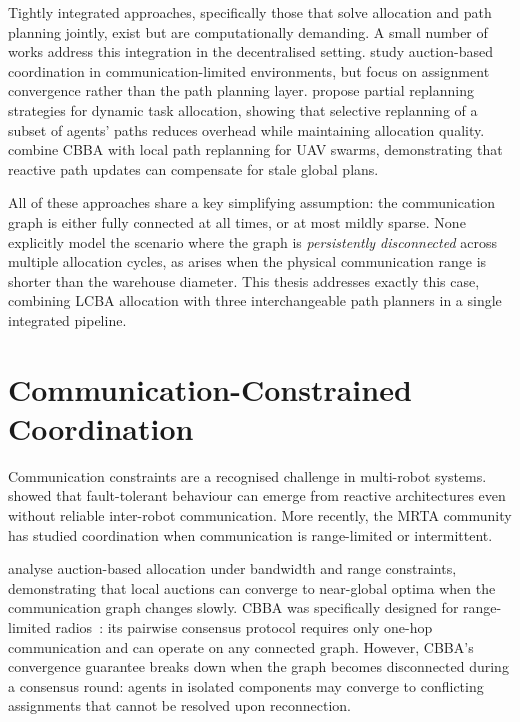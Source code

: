 Tightly integrated approaches, specifically those that solve allocation and path planning
jointly, exist but are computationally demanding.
A small number of works address this integration in the decentralised setting.
\citet{otte2020auctions} study auction-based coordination in communication-limited
environments, but focus on assignment convergence rather than the path planning
layer.
\citet{buckman2019partial} propose partial replanning strategies for dynamic
task allocation, showing that selective replanning of a subset of agents'
paths reduces overhead while maintaining allocation quality.
\citet{chen2021cbbalr} combine CBBA with local path replanning for UAV swarms,
demonstrating that reactive path updates can compensate for stale global plans.

All of these approaches share a key simplifying assumption: the communication
graph is either fully connected at all times, or at most mildly sparse.
None explicitly model the scenario where the graph is \emph{persistently
disconnected} across multiple allocation cycles, as arises when the physical
communication range is shorter than the warehouse diameter.
This thesis addresses exactly this case, combining LCBA allocation
with three interchangeable path planners in a single integrated pipeline.


\section{Communication-Constrained Coordination}
\label{sec:bg_communication}

Communication constraints are a recognised challenge in multi-robot systems.
\citet{parker1998alliance} showed that fault-tolerant behaviour can emerge from
reactive architectures even without reliable inter-robot communication.
More recently, the MRTA community has studied coordination when communication
is range-limited or intermittent.

\citet{otte2020auctions} analyse auction-based allocation under bandwidth and
range constraints, demonstrating that local auctions can converge to near-global
optima when the communication graph changes slowly.
CBBA was specifically designed for range-limited radios~\cite{choi2009consensus}:
its pairwise consensus protocol requires only one-hop communication and can
operate on any connected graph.
However, CBBA's convergence guarantee breaks down when the graph becomes
disconnected during a consensus round: agents in isolated components may
converge to conflicting assignments that cannot be resolved upon reconnection.

